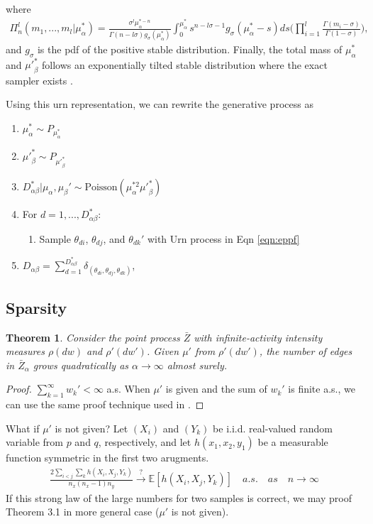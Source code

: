 \documentclass{article}
\newtheorem{theorem}{Theorem}[section]
\begin{document}
where
\begin{align}
\Pi_{n}^l(m_1, ..., m_l|\mu_\alpha^*) = \frac{\sigma^l \mu_\alpha^{*-n}}{\Gamma(n-l\sigma)g_{\sigma}(\mu_\alpha^*)} \int_{0}^{\mu_\alpha^*}s^{n-l\sigma-1}g_{\sigma}(\mu_\alpha^*-s)ds \bigg(\prod_{i=1}^{l} \frac{\Gamma(m_i-\sigma)}{\Gamma(1-\sigma)} \bigg),
\end{align}
and $g_\sigma$ is the pdf of the positive stable distribution.
Finally, the total mass of $\mu_\alpha^*$ and ${\mu'}_\beta^{*}$ follows an exponentially tilted stable distribution where the exact sampler exists \citep{devroye2009random,hofert2011sampling}. 

Using this urn representation, we can rewrite the generative process as
\begin{enumerate}
\item $\mu_\alpha^* \sim P_{\mu_\alpha^*}$
\item ${\mu'}_\beta^{*} \sim P_{{\mu'}_\beta^{*}}$
\item $D_{\alpha\beta}^* | \mu_\alpha, \mu_\beta' \sim \text{Poisson}(\mu_\alpha^{*2}{\mu'}_\beta^{*})$
\item For $d=1,...,D_{\alpha\beta}^*$:
\begin{enumerate}
\item Sample $\theta_{di}$, $\theta_{dj}$, and $\theta_{dk}'$ with Urn process in Eqn \ref{eqn:eppf}
\end{enumerate}
\item $D_{\alpha\beta} = \sum_{d=1}^{D_{\alpha\beta}^*} \delta_{(\theta_{di}, \theta_{dj}, \theta_{dk})}$,
\end{enumerate}

\subsection{Sparsity}

\begin{theorem} \label{thm:edge} Consider the point process $\bar{Z}$ with infinite-activity intensity measures $\rho(dw)$ and $\rho'(dw')$. Given $\mu'$ from $\rho'(dw')$, the number of edges in $\bar{Z}_{\alpha}$ grows quadratically as $\alpha \rightarrow \infty$ almost surely.
\end{theorem}
\begin{proof}
$\sum_{k=1}^{\infty} w_k' < \infty$ a.s. When $\mu'$ is given and the sum of $w_k'$ is finite a.s., we can use the same proof technique used in \cite{Caron2015}.
\end{proof}
What if $\mu'$ is not given? Let $(X_i)$ and $(Y_k)$ be i.i.d. real-valued random variable from $p$ and $q$, respectively, and let $h(x_1, x_2, y_1)$ be a measurable function symmetric in the first two arugments. 
\begin{align}
\frac{2 \sum_{i<j}\sum_{k} h(X_i, X_j, Y_k)}{n_x(n_x -1) n_y} \xrightarrow[]{?} \mathbb{E}[h(X_i, X_j, Y_k)]\quad a.s.\quad as \quad n\rightarrow \infty
\end{align}
If this strong law of the large numbers for two samples is correct, we may proof Theorem 3.1 in more general case ($\mu'$ is not given).
\end{document}
